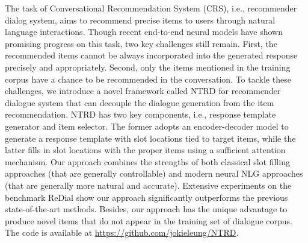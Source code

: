 The task of Conversational Recommendation System (CRS), i.e., recommender dialog system, aims to recommend precise items to users through natural language interactions. Though recent end-to-end neural models have shown promising progress on this task, two key challenges still remain. First, the recommended items cannot be always incorporated into the generated response precisely and appropriately. Second, only the items mentioned in the training corpus have a chance to be recommended in the conversation. To tackle these challenges, we introduce a novel framework called NTRD for recommender dialogue system that can decouple the dialogue generation from the item recommendation. NTRD has two key components, i.e., response template generator and item selector. The former adopts an encoder-decoder model to generate a response template with slot locations tied to target items, while the latter fills in slot locations with the proper items using a sufficient attention mechanism. Our approach combines the strengths of both classical slot filling approaches (that are generally controllable) and modern neural NLG approaches (that are generally more natural and accurate). Extensive experiments on the benchmark ReDial show our approach significantly outperforms the previous state-of-the-art methods. Besides, our approach has the unique advantage to produce novel items that do not appear in the training set of dialogue corpus. The code is available at \url{https://github.com/jokieleung/NTRD}.
